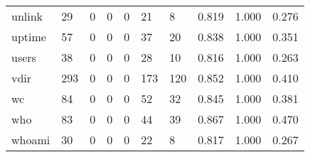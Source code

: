 \begin{longtable}{lp{1.3cm}p{1.3cm}p{1.3cm}p{1.3cm}p{1.3cm}p{1.3cm}p{1.3cm}p{1.3cm}p{1.3cm}}
unlink    &                     29 &                                             0 &                                            0 &                                           0 &                                           21 &                                          8 &                                0.819 &                                  1.000 &                                0.276 \\
uptime    &                     57 &                                             0 &                                            0 &                                           0 &                                           37 &                                         20 &                                0.838 &                                  1.000 &                                0.351 \\
users     &                     38 &                                             0 &                                            0 &                                           0 &                                           28 &                                         10 &                                0.816 &                                  1.000 &                                0.263 \\
vdir      &                    293 &                                             0 &                                            0 &                                           0 &                                          173 &                                        120 &                                0.852 &                                  1.000 &                                0.410 \\
wc        &                     84 &                                             0 &                                            0 &                                           0 &                                           52 &                                         32 &                                0.845 &                                  1.000 &                                0.381 \\
who       &                     83 &                                             0 &                                            0 &                                           0 &                                           44 &                                         39 &                                0.867 &                                  1.000 &                                0.470 \\
whoami    &                     30 &                                             0 &                                            0 &                                           0 &                                           22 &                                          8 &                                0.817 &                                  1.000 &                                0.267 \\

\end{longtable}
